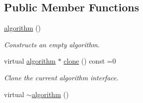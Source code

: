 \subsection*{Public Member Functions}
\begin{DoxyCompactItemize}
\item 
\hypertarget{classmerlin_1_1algorithm_adf0585fe727915bdae253d0213c0db80}{}\hyperlink{classmerlin_1_1algorithm_adf0585fe727915bdae253d0213c0db80}{algorithm} ()\label{classmerlin_1_1algorithm_adf0585fe727915bdae253d0213c0db80}

\begin{DoxyCompactList}\small\item\em Constructs an empty algorithm. \end{DoxyCompactList}\item 
virtual \hyperlink{classmerlin_1_1algorithm}{algorithm} $\ast$ \hyperlink{classmerlin_1_1algorithm_a10f787e24c1fd5ec92c26b18efb0b8db}{clone} () const =0
\begin{DoxyCompactList}\small\item\em Clone the current algorithm interface. \end{DoxyCompactList}\item 
\hypertarget{classmerlin_1_1algorithm_a15a4cf8bb6ed1dc1de3a9e7383c2bbc1}{}virtual \hyperlink{classmerlin_1_1algorithm_a15a4cf8bb6ed1dc1de3a9e7383c2bbc1}{$\sim$algorithm} ()\label{classmerlin_1_1algorithm_a15a4cf8bb6ed1dc1de3a9e7383c2bbc1}


\end{DoxyCompactItemize}
